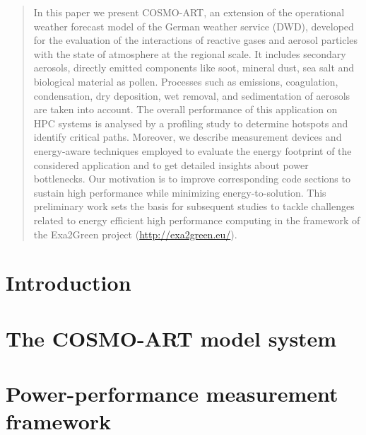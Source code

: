 \documentclass[twocolumn]{svjour3}
\begin{document}
\begin{abstract}
  In this paper we present  COSMO-ART, an extension of the operational
  weather  forecast  model  of   the  German  weather  service  (DWD),
  developed for  the evaluation of the interactions  of reactive gases
  and aerosol particles  with the state of atmosphere  at the regional
  scale. It  includes secondary aerosols,  directly emitted components
  like  soot,  mineral  dust,  sea  salt and  biological  material  as
  pollen. Processes such  as emissions, coagulation, condensation, dry
  deposition,  wet removal,  and sedimentation  of aerosols  are taken
  into account.   The overall performance  of this application  on HPC
  systems is analysed  by a profiling study to  determine hotspots and
  identify critical paths.   Moreover, we describe measurement devices
  and  energy-aware   techniques  employed  to   evaluate  the  energy
  footprint of the considered application and to get detailed insights
  about power bottlenecks.  Our motivation is to improve corresponding
  code   sections  to  sustain   high  performance   while  minimizing
  energy-to-solution.   This  preliminary  work  sets  the  basis  for
  subsequent studies to tackle  challenges related to energy efficient
  high performance computing in the framework of the Exa2Green project
  (\url{http://exa2green.eu/}).

\end{abstract}

\section{Introduction}
\label{intro}


\section{The COSMO-ART model system}
\label{sec:1}


\section{Power-performance measurement framework}
\label{sec:2}

\end{document}
